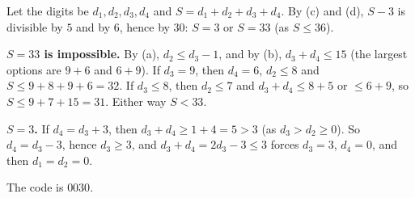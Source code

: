 Let the digits be $d_1,d_2,d_3,d_4$ and $S=d_1+d_2+d_3+d_4$. By (c) and (d), $S-3$ is divisible by $5$ and by $6$, hence by $30$: $S=3$ or $S=33$ (as $S\le36$).

\textbf{$S=33$ is impossible.} By (a), $d_2\le d_3-1$, and by (b), $d_3+d_4\le15$ (the largest options are $9+6$ and $6+9$). If $d_3=9$, then $d_4=6$, $d_2\le8$ and $S\le9+8+9+6=32$. If $d_3\le8$, then $d_2\le7$ and $d_3+d_4\le8+5$ or $\le6+9$, so $S\le9+7+15=31$. Either way $S<33$.

\textbf{$S=3$.} If $d_4=d_3+3$, then $d_3+d_4\ge1+4=5>3$ (as $d_3>d_2\ge0$). So $d_4=d_3-3$, hence $d_3\ge3$, and $d_3+d_4=2d_3-3\le3$ forces $d_3=3$, $d_4=0$, and then $d_1=d_2=0$.

The code is $\boxed{0030}$.
